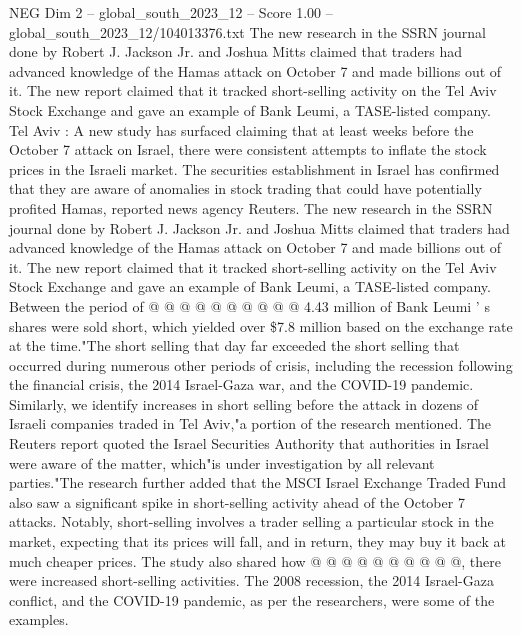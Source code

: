 \begin{textsample}{NEG Dim 2 – global\_south\_2023\_12 – Score 1.00 – global\_south\_2023\_12/104013376.txt}  \label{ex:f2_neg_288}
The new research in the SSRN journal done by Robert J.
Jackson Jr. and Joshua Mitts claimed that traders had advanced knowledge of the Hamas attack on October 7 and made billions out of it.
The new report claimed that it tracked short-selling activity on the Tel Aviv Stock Exchange and gave an example of Bank Leumi, a TASE-listed company.
Tel Aviv : A new study has surfaced claiming that at least weeks before the October 7 attack on Israel, there were consistent attempts to inflate the stock prices in the Israeli market.
The securities establishment in Israel has confirmed that they are aware of anomalies in stock trading that could have potentially profited Hamas, reported news agency Reuters.
The new research in the SSRN journal done by Robert J.
Jackson Jr. and Joshua Mitts claimed that traders had advanced knowledge of the Hamas attack on October 7 and made billions out of it.
The new report claimed that it tracked short-selling activity on the Tel Aviv Stock Exchange and gave an example of Bank Leumi, a TASE-listed company.
Between the period of @ @ @ @ @ @ @ @ @ @ 4.43 million of Bank Leumi ' s shares were sold short, which yielded over \$7.8 million based on the exchange rate at the time."The short selling that day far exceeded the short selling that occurred during numerous other periods of crisis, including the recession following the financial crisis, the 2014 Israel-Gaza war, and the COVID-19 pandemic.
Similarly, we identify increases in short selling before the attack in dozens of Israeli companies traded in Tel Aviv,"a portion of the research mentioned.
The Reuters report quoted the Israel Securities Authority that authorities in Israel were aware of the matter, which"is under investigation by all relevant parties."The research further added that the MSCI Israel Exchange Traded Fund also saw a significant spike in short-selling activity ahead of the October 7 attacks.
Notably, short-selling involves a trader selling a particular stock in the market, expecting that its prices will fall, and in return, they may buy it back at much cheaper prices.
The study also shared how @ @ @ @ @ @ @ @ @ @, there were increased short-selling activities.
The 2008 recession, the 2014 Israel-Gaza conflict, and the COVID-19 pandemic, as per the researchers, were some of the examples.

\end{textsample}
